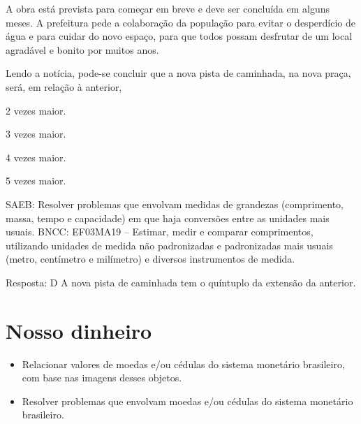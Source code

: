 A obra está prevista para começar em breve e deve ser concluída em alguns meses. A prefeitura pede a colaboração da população para evitar o desperdício de água e para cuidar do novo espaço, para que todos possam desfrutar de um local agradável e bonito por muitos anos.


Lendo a notícia, pode-se concluir que a nova pista de caminhada, na nova praça, será, em relação à anterior,

\begin{escolha}
\item
  2 vezes maior.
\item
  3 vezes maior.
\item
  4 vezes maior.
\item
  5 vezes maior.
\end{escolha}

SAEB: Resolver problemas que envolvam medidas de grandezas (comprimento, massa, tempo e capacidade) em que haja conversões entre as unidades mais usuais. 
BNCC: EF03MA19 -- Estimar, medir e comparar comprimentos, utilizando unidades de medida
não padronizadas e padronizadas mais usuais (metro, centímetro e milímetro) e diversos
instrumentos de medida.


Resposta: D
A nova pista de caminhada tem o quíntuplo da extensão da anterior.

\chapter{Nosso dinheiro}


\begin{itemize}
    \item Relacionar valores de moedas e/ou cédulas do sistema monetário
brasileiro, com base nas imagens desses objetos.

    \item Resolver problemas que envolvam moedas e/ou cédulas do sistema
monetário brasileiro.
\end{itemize}


